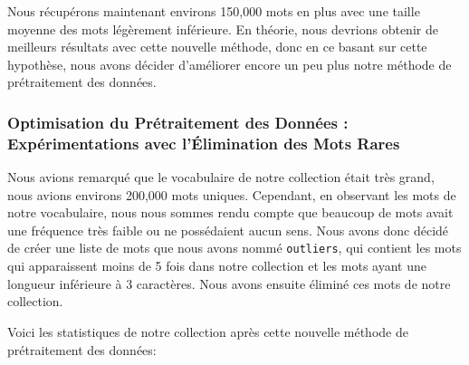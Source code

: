 \documentclass[a4paper, 12pt]{article}
\begin{document}
\begin{table}[!h]
  \begin{minipage}{0.35\linewidth}
      \centering
      \caption{Statistiques de la collection}
  \end{minipage}%
  \hspace{0.05\linewidth} %
  \begin{minipage}{0.60\linewidth}
    Nous récupérons maintenant environs 150,000 mots en plus avec une taille moyenne des mots légèrement inférieure.    
    En théorie, nous devrions obtenir de meilleurs résultats avec cette nouvelle méthode, donc en ce basant sur cette
    hypothèse, nous avons décider d'améliorer encore un peu plus notre méthode de prétraitement des données.
  \end{minipage}

\end{table}

\subsubsection{Optimisation du Prétraitement des Données : Expérimentations avec l'Élimination des Mots Rares}
Nous avions remarqué que le vocabulaire de notre collection était très grand, 
nous avions environs 200,000 mots uniques. Cependant, en observant les mots de notre vocabulaire, 
nous nous sommes rendu compte que beaucoup de mots avait une fréquence très faible ou ne possédaient 
aucun sens. Nous avons donc décidé de créer une liste de mots que nous avons nommé \texttt{outliers},
qui contient les mots qui apparaissent moins de 5 fois dans notre collection et les mots ayant 
une longueur inférieure à 3 caractères. Nous avons ensuite éliminé ces mots de notre collection.


Voici les statistiques de notre collection après cette nouvelle méthode de prétraitement des données:
\end{document}
